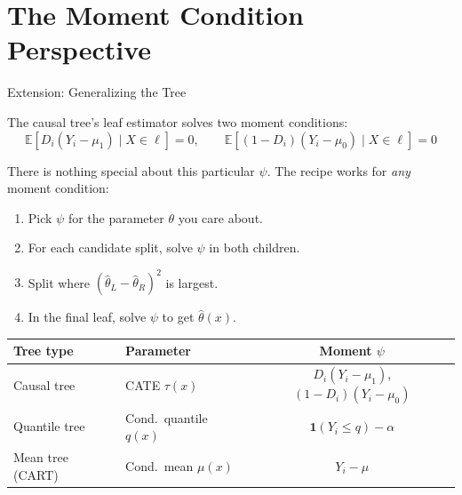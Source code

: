 \documentclass[aspectratio=169, 11pt, handout]{beamer}
\newcommand{\E}{\mathbb{E}}
\begin{document}
 
 
 
\section{The Moment Condition Perspective}
 
\begin{frame}{Extension: Generalizing the Tree}
 
The causal tree's leaf estimator solves two moment conditions:
\[
\E[D_i(Y_i - \mu_1) \mid X \in \ell] = 0, \qquad \E[(1-D_i)(Y_i - \mu_0) \mid X \in \ell] = 0
\]
 
\pause
\bigskip
 
There is nothing special about this particular $\psi$. The recipe works for \emph{any} moment condition:
 
\begin{enumerate}
    \item Pick $\psi$ for the parameter $\theta$ you care about.
    \item For each candidate split, solve $\psi$ in both children.
    \item Split where $(\hat{\theta}_L - \hat{\theta}_R)^2$ is largest.
    \item In the final leaf, solve $\psi$ to get $\hat{\theta}(x)$.
\end{enumerate}
 
\pause
\bigskip
 
\begin{center}
\small
\begin{tabular}{llc}
\toprule
\textbf{Tree type} & \textbf{Parameter} & \textbf{Moment $\psi$} \\
\midrule
Causal tree & CATE $\tau(x)$ & $D_i(Y_i - \mu_1)$, $(1-D_i)(Y_i - \mu_0)$ \\
Quantile tree & Cond.\ quantile $q(x)$ & $\mathbf{1}(Y_i \leq q) - \alpha$ \\
Mean tree (CART) & Cond.\ mean $\mu(x)$ & $Y_i - \mu$ \\
\bottomrule
\end{tabular}
\end{center}
 
\end{frame}
 
\end{document}
